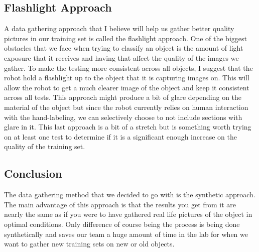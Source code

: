 \documentclass[draftclsnofoot, onecolumn, 10pt, compsoc]{IEEEtran}
\begin{document}
\subsection{Flashlight Approach}
A data gathering approach that I believe will help us gather better quality pictures in our training set is called the flashlight approach. One of the biggest obstacles that we face when trying to classify an object is the amount of light exposure that it receives and having that affect the quality of the images we gather. To make the testing more consistent across all objects, I suggest that the robot hold a flashlight up to the object that it is capturing images on. This will allow the robot to get a much clearer image of the object and keep it consistent across all tests. This approach might produce a bit of glare depending on the material of the object but since the robot currently relies on human interaction with the hand-labeling, we can selectively choose to not include sections with glare in it. This last approach is a bit of a stretch but is something worth trying on at least one test to determine if it is a significant enough increase on the quality of the training set.
\subsection{Conclusion}
The data gathering method that we decided to go with is the synthetic approach. The main advantage of this approach is that the results you get from it are nearly the same as if you were to have gathered real life pictures of the object in optimal conditions. Only difference of course being the process is being done synthetically and saves our team a huge amount of time in the lab for when we want to gather new training sets on new or old objects.


\end{document}
